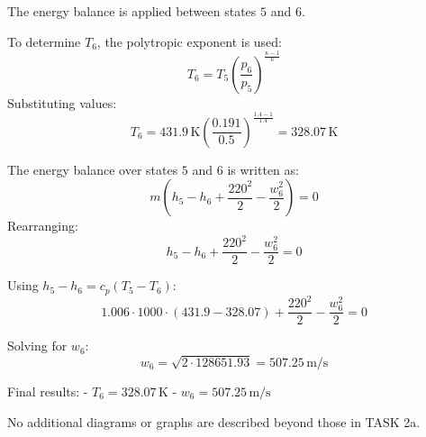 The energy balance is applied between states \(5\) and \(6\).  

To determine \(T_6\), the polytropic exponent is used:  
\[
T_6 = T_5 \left( \frac{p_6}{p_5} \right)^{\frac{\kappa - 1}{\kappa}}
\]  
Substituting values:  
\[
T_6 = 431.9 \, \text{K} \left( \frac{0.191}{0.5} \right)^{\frac{1.4 - 1}{1.4}} = 328.07 \, \text{K}
\]  

The energy balance over states \(5\) and \(6\) is written as:  
\[
m \left( h_5 - h_6 + \frac{220^2}{2} - \frac{w_6^2}{2} \right) = 0
\]  
Rearranging:  
\[
h_5 - h_6 + \frac{220^2}{2} - \frac{w_6^2}{2} = 0
\]  

Using \(h_5 - h_6 = c_p (T_5 - T_6)\):  
\[
1.006 \cdot 1000 \cdot (431.9 - 328.07) + \frac{220^2}{2} - \frac{w_6^2}{2} = 0
\]  

Solving for \(w_6\):  
\[
w_6 = \sqrt{2 \cdot 128651.93} = 507.25 \, \text{m/s}
\]  

Final results:  
- \(T_6 = 328.07 \, \text{K}\)  
- \(w_6 = 507.25 \, \text{m/s}\)  

No additional diagrams or graphs are described beyond those in TASK 2a.